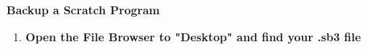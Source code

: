 \documentclass{article}
\begin{document}
	
	{\huge \textbf{Backup a Scratch Program}}
	
\begin{enumerate}
\item {\large \textbf{Open the File Browser to "Desktop" and find your .sb3 file}}



\end{enumerate}
\end{document}
